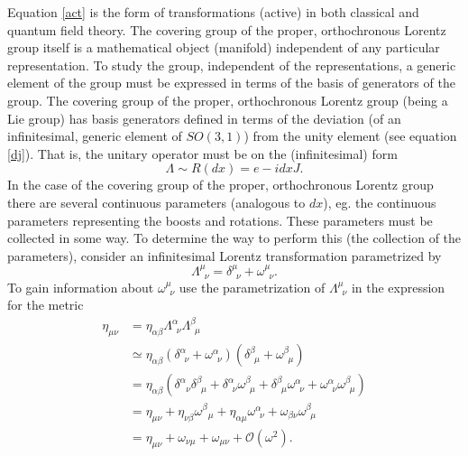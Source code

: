 Equation \eqref{act} is the form of transformations (active) in both classical and quantum field theory. The covering group of the proper, orthochronous Lorentz group itself is a mathematical object (manifold) independent of any particular representation. To study the group, independent of the representations, a generic element of the group must be expressed in terms of the basis of generators of the group. The covering group of the proper, orthochronous Lorentz group (being a Lie group) has basis generators defined in terms of the deviation (of an infinitesimal, generic element of $SO(3,1)$) from the unity element (see equation \eqref{dj}). That is, the unitary operator must be on the (infinitesimal) form
\begin{equation}
	\Lambda\sim R(dx)=e-idxJ.
\end{equation} 
In the case of the covering group of the proper, orthochronous Lorentz group there are several continuous parameters (analogous to $dx$), eg. the continuous parameters representing the boosts and rotations. These parameters must be collected in some way. To determine the way to perform this (the collection of the parameters), consider an infinitesimal Lorentz transformation parametrized by
\begin{equation}
	\Lambda^\mu_{\,\,\,\nu}=\delta^\mu_{\,\,\,\nu}+\omega^\mu_{\,\,\,\nu}.
	\label{j8}
\end{equation}  
To gain information about $\omega^\mu_{\,\,\,\nu}$ use the parametrization of $\Lambda^\mu_{\,\,\,\nu}$ in the expression for the metric
\begin{equation}
	\begin{split}
		\eta_{\mu\nu}&=\eta_{\alpha\beta}\Lambda^\alpha_{\,\,\,\nu}\Lambda^\beta_{\,\,\,\mu}\\
		&\simeq\eta_{\alpha\beta}(\delta^\alpha_{\,\,\,\nu}+\omega^\alpha_{\,\,\,\nu})(\delta^\beta_{\,\,\,\mu}+\omega^\beta_{\,\,\,\mu})\\
		&=\eta_{\alpha\beta}(\delta^\alpha_{\,\,\,\,\nu}\delta^\beta_{\,\,\,\mu}+\delta^\alpha_{\,\,\,\nu}\omega^\beta_{\,\,\,\mu}+\delta^\beta_{\,\,\,\mu}\omega^\alpha_{\,\,\,\nu}+\omega^\alpha_{\,\,\,\nu}\omega^\beta_{\,\,\,\mu})\\
		&=\eta_{\mu\nu}+\eta_{\nu\beta}\omega^\beta_{\,\,\,\,\mu}+\eta_{\alpha\mu}\omega^\alpha_{\,\,\,\nu}+\omega_{\beta\nu}\omega^\beta_{\,\,\,\mu}\\
		&=\eta_{\mu\nu}+\omega_{\nu\mu}+\omega_{\mu\nu}+\mathcal{O}(\omega^2).
	\end{split}
\end{equation} 
